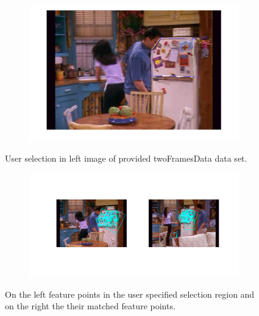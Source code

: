 \documentclass{paper}
\begin{document}
\begin{figure}[H]
\centering
\begin{subfigure}{1.0\textwidth}
\includegraphics[width=\textwidth]{figures/raw_matches/friends/friendsSelection}
\end{subfigure}
\caption{User selection in left image of provided twoFramesData data set.}
\label{fig:friends_raw_sel}
\end{figure}

\begin{figure}[H]
\centering
\begin{subfigure}{1.0\textwidth}
\includegraphics[width=\textwidth]{figures/raw_matches/friends/friendsMatches}
\end{subfigure}
\caption{On the left feature points in the user specified selection region and on the right the their matched feature points.}
\label{fig:friends_raw_matching}
\end{figure}
\end{document}
